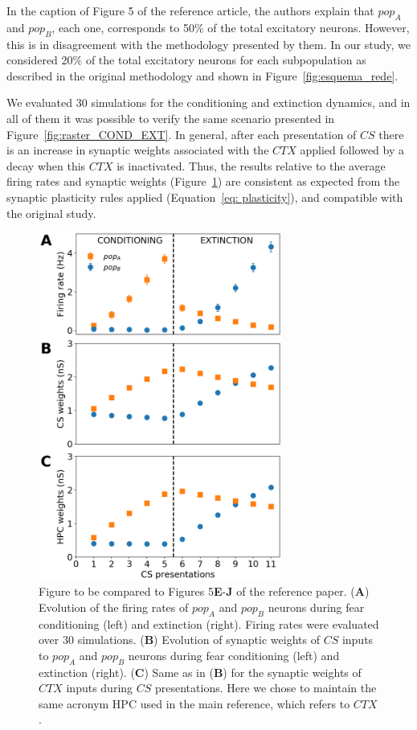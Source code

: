 In the caption of Figure 5 of the reference article, the authors explain that $pop_A$ and $pop_B$, each one, corresponds to 50\% of the total excitatory neurons. However, this is in disagreement with the methodology presented by them. In our study, we considered 20\% of the total excitatory neurons for each subpopulation as described in the original methodology and shown in Figure~\ref{fig:esquema_rede}.

We evaluated 30 simulations for the conditioning and extinction dynamics, and in all of them it was possible to verify the same scenario presented in Figure~\ref{fig:raster_COND_EXT}. In general, after each presentation of $CS$ there is an increase in synaptic weights associated with the $CTX$ applied followed by a decay when this $CTX$ is inactivated. Thus, the results relative to the average firing rates and synaptic weights (Figure~\ref{fig:weights_COND_EXT}) are consistent as expected from the synaptic plasticity rules applied (Equation~\ref{eq: plasticity}), and compatible with the original study.

\begin{figure}[!ht]
\centering
\includegraphics[width=8cm]{figures/COND_EXT_avarages.png}
\caption{\label{fig:weights_COND_EXT} Figure to be compared to Figures 5\textbf{E}-\textbf{J} of the reference paper. (\textbf{A}) Evolution of the firing rates of $pop_A$ and $pop_B$ neurons during fear conditioning (left) and extinction (right). Firing rates were evaluated over 30 simulations. (\textbf{B}) Evolution of synaptic weights of $CS$ inputs to $pop_A$ and $pop_B$ neurons during fear conditioning (left) and extinction (right). (\textbf{C}) Same as in (\textbf{B}) for the synaptic weights of $CTX$ inputs during $CS$ presentations. Here we chose to maintain the same acronym HPC used in the main reference, which refers to $CTX$.}
\end{figure}
\FloatBarrier

